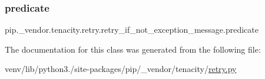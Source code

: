 \subsubsection{\texorpdfstring{predicate}{predicate}}
{\footnotesize\ttfamily pip.\+\_\+vendor.\+tenacity.\+retry.\+retry\+\_\+if\+\_\+not\+\_\+exception\+\_\+message.\+predicate\hspace{0.3cm}{\ttfamily [static]}}



The documentation for this class was generated from the following file\+:\begin{DoxyCompactItemize}
\item 
venv/lib/python3./site-\/packages/pip/\+\_\+vendor/tenacity/\hyperlink{tenacity_2retry_8py}{retry.\+py}\end{DoxyCompactItemize}
